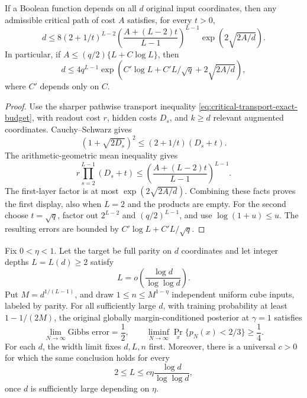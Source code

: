 \begin{lemma}
\label{lem:critical-joint-budget}
If a Boolean function depends on all $d$ original input coordinates,
then any admissible critical path of cost $A$ satisfies, for every $t>0$,
\[
 d\le8(2+1/t)^{L-2}
 \left(\frac{A+(L-2)t}{L-1}\right)^{L-1}
 \exp\!\left(2\sqrt{2A/d}\right).
\]
In particular, if $A\le(q/2)\{L+C\log L\}$, then
\[
 d\le4q^{L-1}
 \exp\!\left(C'\log L+C'L/\sqrt q+2\sqrt{2A/d}\right),
\]
where $C'$ depends only on $C$.
\end{lemma}

\begin{proof}
Use the sharper pathwise transport inequality
\eqref{eq:critical-transport-exact-budget}, with readout cost $r$,
hidden costs $D_s$, and $k\ge d$ relevant augmented coordinates.
Cauchy--Schwarz gives
\[
 (1+\sqrt{2D_s})^2\le(2+1/t)(D_s+t).
\]
The arithmetic-geometric mean inequality gives
\[
 r\prod_{s=2}^{L-1}(D_s+t)
 \le\left(\frac{A+(L-2)t}{L-1}\right)^{L-1}.
\]
The first-layer factor is at most $\exp(2\sqrt{2A/d})$.
Combining these facts proves the first display, also when $L=2$ and
the products are empty. For the second choose $t=\sqrt q$, factor out
$2^{L-2}$ and $(q/2)^{L-1}$, and use
$\log(1+u)\le u$. The resulting errors are bounded by
$C'\log L+C'L/\sqrt q$.
\end{proof}

\begin{theorem}
\label{thm:critical-nearly-logarithmic-depth}
Fix $0<\eta<1$. Let the target be full parity on $d$ coordinates and
let integer depths $L=L(d)\ge2$ satisfy
\[
 L=o\!\left(\frac{\log d}{\log\log d}\right).
\]
Put $M=d^{1/(L-1)}$, and draw
$1\le n\le M^{1-\eta}$ independent uniform cube inputs, labeled by
parity. For all sufficiently large $d$, with training probability at
least $1-1/(2M)$, the original globally margin-conditioned posterior at
$\gamma=1$ satisfies
\[
 \lim_{N\to\infty}\text{Gibbs error}=\frac12,
 \qquad
 \liminf_{N\to\infty}\Pr_x\{p_N(x)<2/3\}\ge\frac14.
\]
For each $d$, the width limit fixes $d,L,n$ first. Moreover, there is a
universal $c>0$ for which the same conclusion holds for every
\[
 2\le L\le c\eta\frac{\log d}{\log\log d},
\]
once $d$ is sufficiently large depending on $\eta$.
\end{theorem}


